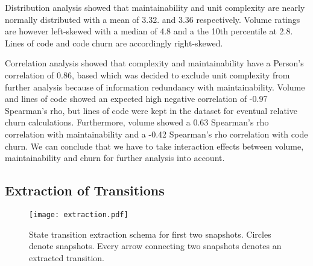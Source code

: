 Distribution analysis showed that maintainability and unit complexity are nearly normally distributed with a mean of 3.32. and 3.36 respectively. Volume ratings are however left-skewed with a median of 4.8 and a the 10th percentile at 2.8. Lines of code and code churn are accordingly right-skewed. 

Correlation analysis showed that complexity and maintainability have a Person's correlation of 0.86, based which was decided to exclude unit complexity from further analysis because of information redundancy with maintainability. Volume and lines of code showed an expected high negative correlation of -0.97 Spearman's rho, but lines of code were kept in the dataset for eventual relative churn calculations. Furthermore, volume showed a 0.63 Spearman's rho correlation with maintainability and a -0.42 Spearman's rho correlation with code churn. We can conclude that we have to take interaction effects between volume, maintainability and churn for further analysis into account.


\subsection{Extraction of Transitions}

\begin{figure}[htbp!]
  \label{schema}
  \centering
  \texttt{[image: extraction.pdf]}
  \caption{State transition extraction schema for first two snapshots. Circles denote snapshots. Every arrow connecting two snapshots denotes an extracted transition.}
\end{figure}

